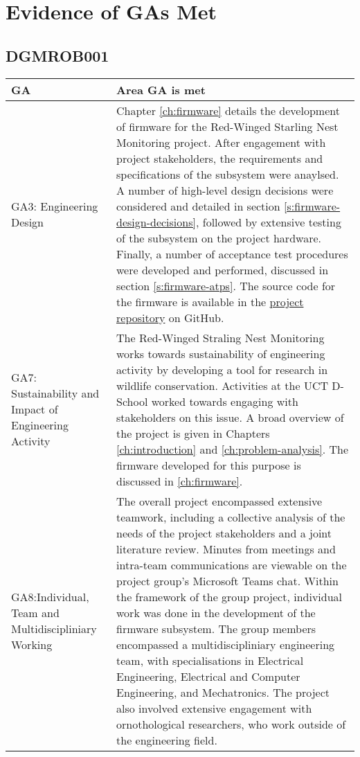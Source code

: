 \documentclass[class=report,11pt,crop=false]{standalone}
\begin{document}
\ifstandalone
\tableofcontents
\fi


\chapter{Evidence of GAs Met}

\section{DGMROB001}

\centering
\begin{tabularx}{\textwidth}{|p{} X|}

    \hline
    \textbf{GA}  & \textbf{Area GA is met} \\ \hline

    GA3: Engineering Design & Chapter \ref{ch:firmware} details the development of firmware for the Red-Winged Starling Nest Monitoring project. After engagement with project stakeholders, the requirements and specifications of the subsystem were anaylsed. A number of high-level design decisions were considered and detailed in section \ref{s:firmware-design-decisions}, followed by extensive testing of the subsystem on the project hardware. Finally, a number of acceptance test procedures were developed and performed, discussed in section \ref{s:firmware-atps}. The source code for the firmware is available in the \href{https://github.com/rothdu/EEE4113F-Group13-2024}{project repository} on GitHub. \\ \hline

    GA7: Sustainability and Impact of Engineering Activity & The Red-Winged Straling Nest Monitoring works towards sustainability of engineering activity by developing a tool for research in wildlife conservation. Activities at the UCT D-School worked towards engaging with stakeholders on this issue. A broad overview of the project is given in Chapters \ref{ch:introduction} and \ref{ch:problem-analysis}. The firmware developed for this purpose is discussed in \ref{ch:firmware}.\\ \hline

    GA8:Individual, Team and Multidiscipliniary Working & The overall project encompassed extensive teamwork, including a collective analysis of the needs of the project stakeholders and a joint literature review. Minutes from meetings and intra-team communications are viewable on the project group's Microsoft Teams chat. Within the framework of the group project, individual work was done in the development of the firmware subsystem. The group members encompassed a multidiscipliniary engineering team, with specialisations in Electrical Engineering, Electrical and Computer Engineering, and Mechatronics. The project also involved extensive engagement with ornothological researchers, who work outside of the engineering field. \\ \hline


\end{tabularx}
\end{document}
